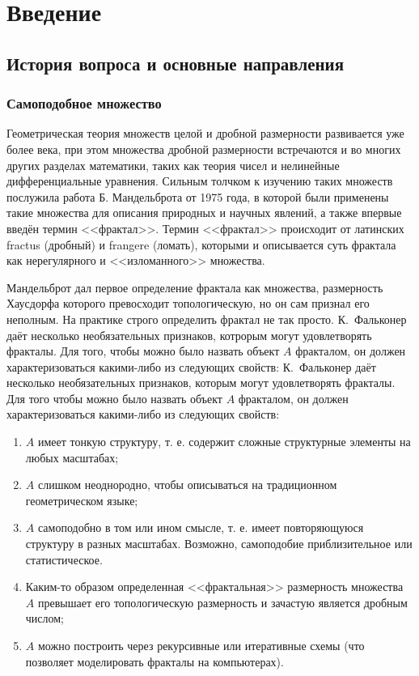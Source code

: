 \chapter*{Введение}                         %


\section{История вопроса и основные направления}


\subsection{Самоподобное множество}

Геометрическая теория множеств целой и дробной размерности развивается уже более века, при этом множества дробной размерности встречаются и во многих других разделах математики, таких как теория чисел и нелинейные дифференциальные уравнения.
Сильным толчком к изучению таких множеств послужила работа \cite{Man75} Б. Мандельброта от 1975 года, в которой были применены такие множества для описания природных и научных явлений, а также впервые введён термин <<фрактал>>.
Термин <<фрактал>> происходит от латинских fractus (дробный) и frangere (ломать), которыми и описывается суть фрактала как нерегулярного и <<изломанного>> множества.

Мандельброт дал первое определение фрактала как множества, размерность Хаусдорфа которого превосходит топологическую, но он сам признал его неполным.
На практике строго определить фрактал не так просто.
К.~Фальконер \cite{Falconer2004} даёт несколько необязательных признаков, котрорым могут удовлетворять фракталы.
Для того, чтобы можно было назвать объект $A$ фракталом, он должен характеризоваться какими-либо из следующих свойств:
К.~Фальконер \cite{Falconer2004} даёт несколько необязательных признаков, которым могут удовлетворять фракталы.
Для того чтобы можно было назвать объект $A$ фракталом, он должен характеризоваться какими-либо из следующих свойств:

\begin{enumerate}
\item $A$ имеет тонкую структуру, т. е. содержит сложные структурные элементы на любых масштабах;
\item $A$ слишком неоднородно, чтобы описываться на традиционном геометрическом языке;
\item $A$ самоподобно в том или ином смысле, т. е. имеет повторяющуюся структуру в разных масштабах. Возможно, самоподобие приблизительное или статистическое.
\item Каким-то образом определенная <<фрактальная>> размерность множества $A$ превышает его топологическую размерность и зачастую является дробным числом;
\item $A$ можно построить через рекурсивные или итеративные схемы (что позволяет моделировать фракталы на компьютерах).
\end{enumerate}



